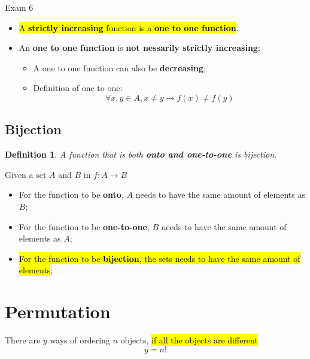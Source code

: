 \documentclass{note}
\newtheorem{definition}{Definition}
\begin{document}
\begin{note}{Exam 6}
        \begin{itemize}
            \item \hl{A \textbf{strictly increasing} function is a \textbf{one to one function}}.
            \item An \textbf{one to one function} is \textbf{not nessarily strictly increasing};
            \begin{itemize}
                \item A one to one function can also be \textbf{decreasing};
                \item Definition of one to one:
                \begin{displaymath}
                    \forall x, y \in A, x \neq y \to f(x) \neq f(y)
                \end{displaymath}
            \end{itemize}
        \end{itemize}

        \subsection{Bijection}

        \begin{definition}
            A function that is both \textbf{onto and one-to-one} is bijection.
        \end{definition}

        Given a set $ A $ and $ B $ in $ f: A \to B $
        \begin{itemize}
            \item For the function to be \textbf{onto}, $ A $ needs to have the same amount of elements as $ B $;
            \item For the function to be \textbf{one-to-one}, $ B $ needs to have the same amount of elements as $ A $;
            \item \hl{For the function to be \textbf{bijection}, the sets needs to have the same amount of elements};
        \end{itemize}

        \section{Permutation}

        There are $ y $ ways of ordering $ n $ objects, \hl{if all the objects are different}
        \begin{equation}\label{eq: ordering permutation}
            y = n!
        \end{equation}


\end{note}
\end{document}
